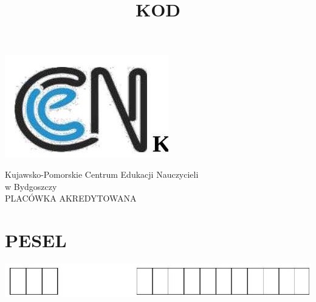 \documentclass[10pt]{article}
\title{KOD }
\author{}
\date{}
\begin{document}
\maketitle
\begin{center}
\includegraphics[max width=\textwidth]{2024_11_21_b31e6de468170710de69g-01}
\end{center}

Kujawsko-Pomorskie Centrum Edukacji Nauczycieli\\
w Bydgoszczy\\
PLACÓWKA AKREDYTOWANA

\section*{PESEL}
\begin{center}
\includegraphics[max width=\textwidth]{2024_11_21_b31e6de468170710de69g-01(2)}
\end{center}
\end{document}
